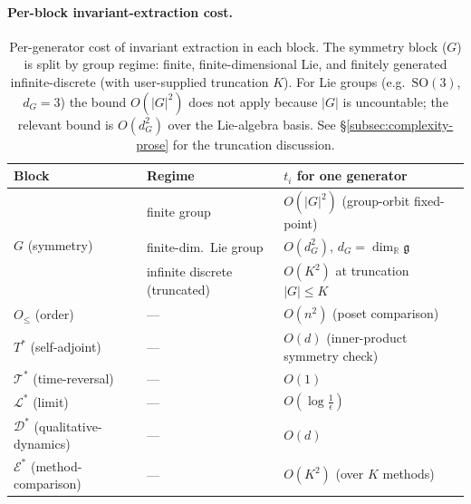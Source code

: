 \documentclass[acmsmall, screen]{acmart}
\begin{document}
\paragraph{Per-block invariant-extraction cost.}
\begin{table}[h]
\centering
\caption{Per-generator cost of invariant extraction in each block. The symmetry block ($G$) is split by group regime: finite, finite-dimensional Lie, and finitely generated infinite-discrete (with user-supplied truncation $K$). For Lie groups (e.g.\ $\mathrm{SO}(3)$, $d_G=3$) the bound $O(|G|^2)$ does not apply because $|G|$ is uncountable; the relevant bound is $O(d_G^2)$ over the Lie-algebra basis. See \S\ref{subsec:complexity-prose} for the truncation discussion.}
\label{tab:complexity}
\small
\begin{tabular}{lll}
\toprule
\textbf{Block} & \textbf{Regime} & \textbf{$t_i$ for one generator} \\
\midrule
\multirow{3}{*}{$G$ (symmetry)}
  & finite group & $O(|G|^2)$ (group-orbit fixed-point) \\
  & finite-dim.\ Lie group & $O(d_G^2)$, $d_G = \dim_{\mathbb{R}} \mathfrak{g}$ \\
  & infinite discrete (truncated) & $O(K^2)$ at truncation $|G|\le K$ \\
\midrule
$O_{\le}$ (order) & --- & $O(n^2)$ (poset comparison) \\
$T^{*}$ (self-adjoint) & --- & $O(d)$ (inner-product symmetry check) \\
$\mathcal{T}^{*}$ (time-reversal) & --- & $O(1)$ \\
$\mathcal{L}^{*}$ (limit) & --- & $O(\log\!\frac{1}{\epsilon})$ \\
$\mathcal{D}^{*}$ (qualitative-dynamics) & --- & $O(d)$ \\
$\mathcal{E}^{*}$ (method-comparison) & --- & $O(K^2)$ (over $K$ methods) \\
\bottomrule
\end{tabular}
\end{table}
\end{document}
